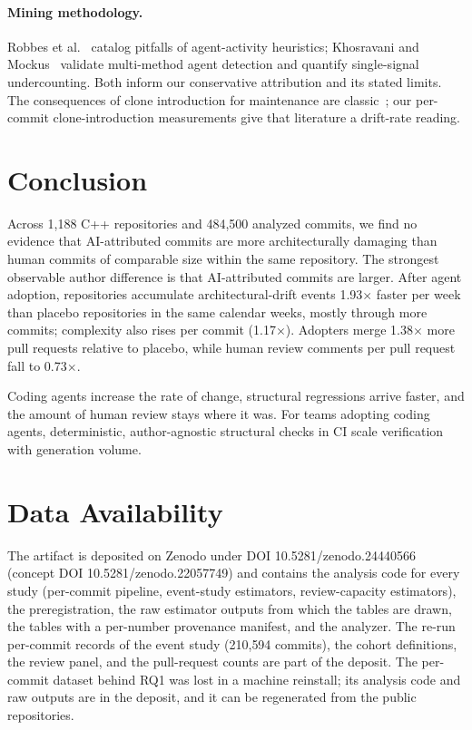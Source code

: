 \documentclass[sigplan,11pt,nonacm=true]{acmart}
\newcommand{\x}{$\times$}
\begin{document}
\paragraph{Mining methodology.} Robbes et al.~\cite{robbes2026perils} catalog
pitfalls of agent-activity heuristics; Khosravani and
Mockus~\cite{khosravani2026census} validate multi-method agent detection and
quantify single-signal undercounting. Both inform our conservative
attribution and its stated limits. The consequences of clone introduction for
maintenance are classic~\cite{juergens2009}; our per-commit clone-introduction
measurements give that literature a drift-rate reading.

\section{Conclusion}

Across 1{,}188 C++ repositories and 484{,}500 analyzed commits, we find no
evidence that AI-attributed commits are more architecturally damaging than
human commits of comparable size within the same repository. The strongest
observable author difference is that AI-attributed commits are larger. After
agent adoption, repositories accumulate architectural-drift events 1.93\x{}
faster per week than placebo repositories in the same calendar weeks, mostly
through more commits; complexity also rises per commit (1.17\x{}). Adopters
merge 1.38\x{} more pull requests relative to placebo, while human review
comments per pull request fall to 0.73\x{}.

Coding agents increase the rate of change, structural regressions arrive
faster, and the amount of human review stays where it was. For teams adopting
coding agents, deterministic, author-agnostic structural checks in CI scale
verification with generation volume.

\section*{Data Availability}
\label{sec:data}

The artifact is deposited on Zenodo under DOI 10.5281/\allowbreak zenodo.24440566
(concept DOI 10.5281/\allowbreak zenodo.22057749) and
contains the analysis code for every study (per-commit pipeline, event-study
estimators, review-capacity estimators), the preregistration, the raw
estimator outputs from which the tables are drawn, the tables with a
per-number provenance manifest, and the analyzer. The re-run per-commit
records of the event study (210{,}594 commits), the cohort definitions, the
review panel, and the pull-request counts are part of the deposit. The
per-commit dataset behind RQ1 was lost in a machine reinstall; its analysis
code and raw outputs are in the deposit, and it can be regenerated from the
public repositories.
\end{document}
